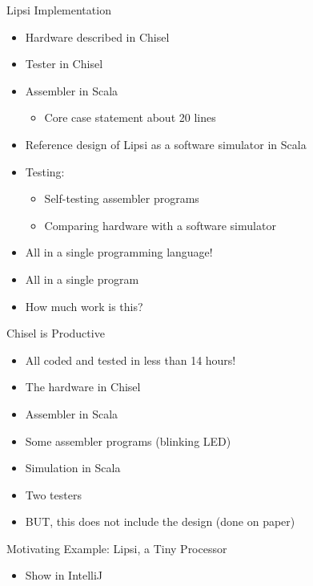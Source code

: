 \begin{frame}[fragile]{Lipsi Implementation}
\begin{itemize}
\item Hardware described in Chisel
\item Tester in Chisel
\item Assembler in Scala
\begin{itemize}
\item Core case statement about 20 lines
\end{itemize}
\item Reference design of Lipsi as a software simulator in Scala
\item Testing:
\begin{itemize}
\item Self-testing assembler programs
\item Comparing hardware with a software simulator
\end{itemize}
\item All in a single programming language!
\item All in a single program
\item How much work is this?
\end{itemize}
\end{frame}

\begin{frame}[fragile]{Chisel is Productive}
\begin{itemize}
\item All coded and tested in less than 14 hours!
\end{itemize}
\begin{itemize}
\item The hardware in Chisel
\item Assembler in Scala
\item Some assembler programs (blinking LED)
\item Simulation in Scala
\item Two testers
\end{itemize}
\begin{itemize}
\item BUT, this does not include the design (done on paper)
\end{itemize}
\end{frame}

\begin{frame}[fragile]{Motivating Example: Lipsi, a Tiny Processor}
\begin{itemize}
\item Show in IntelliJ
\end{itemize}
\end{frame}

